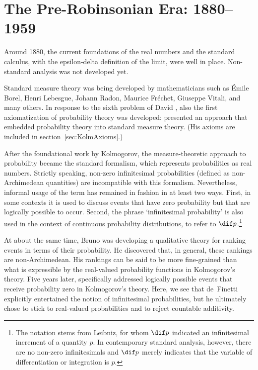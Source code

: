\section{The Pre-Robinsonian Era: 1880--1959}\label{sec:preR}
Around 1880, the current foundations of the real numbers and the standard calculus, with the epsilon-delta definition of the limit, were well in place. Non-standard analysis was not developed yet.

Standard measure theory was being developed by mathematicians such as {\'E}mile Borel, Henri Lebesgue, Johann Radon, Maurice Fr{\'e}chet, Giuseppe Vitali, and many others. In response to the sixth problem of David \citet{Hilbert:1900}, also the first axiomatization of probability theory was developed: \citet{Kolmogorov:1933} presented an approach that embedded probability theory into standard measure theory. (His axioms are included in section~\ref{sec:KolmAxioms}.)

After the foundational work by Kolmogorov, the measure-theoretic approach to probability became the standard formalism, which represents probabilities as real numbers. Strictly speaking, non-zero infinitesimal probabilities (defined as non-Archimedean quantities) are incompatible with this formalism. Nevertheless, informal usage of the term has remained in fashion in at least two ways. First, in some contexts it is used to discuss events that have zero probability but that are logically possible to occur. Second, the phrase `infinitesimal probability' is also used in the context of continuous probability distributions, to refer to $\dif p$.\footnote{The notation stems from Leibniz, for whom $\dif p$ indicated an infinitesimal increment of a quantity $p$. In contemporary standard analysis, however, there are no non-zero infinitesimals and $\dif p$ merely indicates that the variable of differentiation or integration is $p$.}

At about the same time, Bruno \citet{deFinetti:1931} was developing a qualitative theory for ranking events in terms of their probability. He discovered that, in general, these rankings are non-Archimedean. His rankings can be said to be more fine-grained than what is expressible by the real-valued probability functions in Kolmogorov's theory. Five years later, \citet{deFinetti:1936} specifically addressed logically possible events that receive probability zero in Kolmogorov's theory. Here, we see that de~Finetti explicitly entertained the notion of infinitesimal probabilities, but he ultimately chose to stick to real-valued probabilities and to reject countable additivity.

